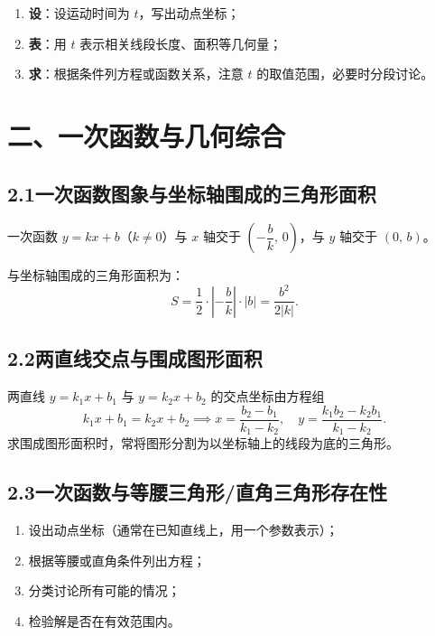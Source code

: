\documentclass[12pt, a4paper]{ctexart}
\begin{document}
\begin{tipbox}
\begin{enumerate}[label=\textbf{(\arabic*)}]
  \item \textbf{设}：设运动时间为 $t$，写出动点坐标；
  \item \textbf{表}：用 $t$ 表示相关线段长度、面积等几何量；
  \item \textbf{求}：根据条件列方程或函数关系，注意 $t$ 的取值范围，必要时分段讨论。
\end{enumerate}
\end{tipbox}

\section*{\textcolor{mainblue}{二、一次函数与几何综合}}

\subsection*{2.1\quad 一次函数图象与坐标轴围成的三角形面积}

\begin{knowledgebox}[基本结论]
一次函数 $y=kx+b$（$k\ne 0$）与 $x$ 轴交于 $\left(-\dfrac{b}{k},\,0\right)$，与 $y$ 轴交于 $(0,\,b)$。

与坐标轴围成的三角形面积为：
\[S = \frac{1}{2}\cdot\left|-\frac{b}{k}\right|\cdot|b| = \frac{b^2}{2|k|}.\]
\end{knowledgebox}

\subsection*{2.2\quad 两直线交点与围成图形面积}

\begin{knowledgebox}[求交点]
两直线 $y=k_1x+b_1$ 与 $y=k_2x+b_2$ 的交点坐标由方程组
\[k_1x+b_1=k_2x+b_2 \implies x=\frac{b_2-b_1}{k_1-k_2},\quad y=\frac{k_1 b_2-k_2 b_1}{k_1-k_2}.\]
求围成图形面积时，常将图形分割为以坐标轴上的线段为底的三角形。
\end{knowledgebox}

\subsection*{2.3\quad 一次函数与等腰三角形/直角三角形存在性}

\begin{knowledgebox}[存在性问题的处理方法]
\begin{enumerate}[label=(\arabic*)]
  \item 设出动点坐标（通常在已知直线上，用一个参数表示）；
  \item 根据等腰或直角条件列出方程；
  \item 分类讨论所有可能的情况；
  \item 检验解是否在有效范围内。
\end{enumerate}
\end{knowledgebox}
\end{document}
